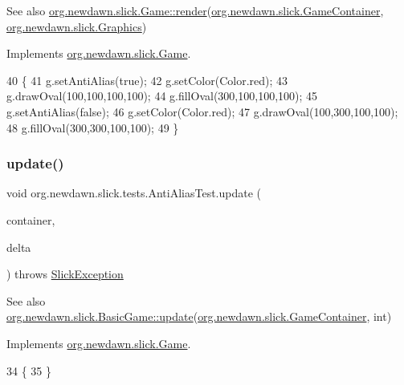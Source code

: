 \begin{DoxySeeAlso}{See also}
\mbox{\hyperlink{interfaceorg_1_1newdawn_1_1slick_1_1_game_af1a4670d43eb3ba04dfcf55ab1975b64}{org.\+newdawn.\+slick.\+Game\+::render}}(\mbox{\hyperlink{classorg_1_1newdawn_1_1slick_1_1_game_container}{org.\+newdawn.\+slick.\+Game\+Container}}, \mbox{\hyperlink{classorg_1_1newdawn_1_1slick_1_1_graphics}{org.\+newdawn.\+slick.\+Graphics}}) 
\end{DoxySeeAlso}


Implements \mbox{\hyperlink{interfaceorg_1_1newdawn_1_1slick_1_1_game_af1a4670d43eb3ba04dfcf55ab1975b64}{org.\+newdawn.\+slick.\+Game}}.


\begin{DoxyCode}
40                                                                                   \{
41         g.setAntiAlias(\textcolor{keyword}{true});
42         g.setColor(Color.red);
43         g.drawOval(100,100,100,100);
44         g.fillOval(300,100,100,100);
45         g.setAntiAlias(\textcolor{keyword}{false});
46         g.setColor(Color.red);
47         g.drawOval(100,300,100,100);
48         g.fillOval(300,300,100,100);
49     \}
\end{DoxyCode}
\mbox{\label{classorg_1_1newdawn_1_1slick_1_1tests_1_1_anti_alias_test_a045a75309e914fa8040339578abb1af1}} 
\subsubsection{\texorpdfstring{update()}{update()}}
{\footnotesize\ttfamily void org.\+newdawn.\+slick.\+tests.\+Anti\+Alias\+Test.\+update (\begin{DoxyParamCaption}\item[{\mbox{\hyperlink{classorg_1_1newdawn_1_1slick_1_1_game_container}{Game\+Container}}}]{container,  }\item[{int}]{delta }\end{DoxyParamCaption}) throws \mbox{\hyperlink{classorg_1_1newdawn_1_1slick_1_1_slick_exception}{Slick\+Exception}}\hspace{0.3cm}{\ttfamily [inline]}}

\begin{DoxySeeAlso}{See also}
\mbox{\hyperlink{classorg_1_1newdawn_1_1slick_1_1_basic_game_acfe6fa05aef83bff1631af91a3e4bd20}{org.\+newdawn.\+slick.\+Basic\+Game\+::update}}(\mbox{\hyperlink{classorg_1_1newdawn_1_1slick_1_1_game_container}{org.\+newdawn.\+slick.\+Game\+Container}}, int) 
\end{DoxySeeAlso}


Implements \mbox{\hyperlink{interfaceorg_1_1newdawn_1_1slick_1_1_game_ab07b2e9463ee4631620dde0de25bdee8}{org.\+newdawn.\+slick.\+Game}}.


\begin{DoxyCode}
34                                                                                  \{
35     \}
\end{DoxyCode}
